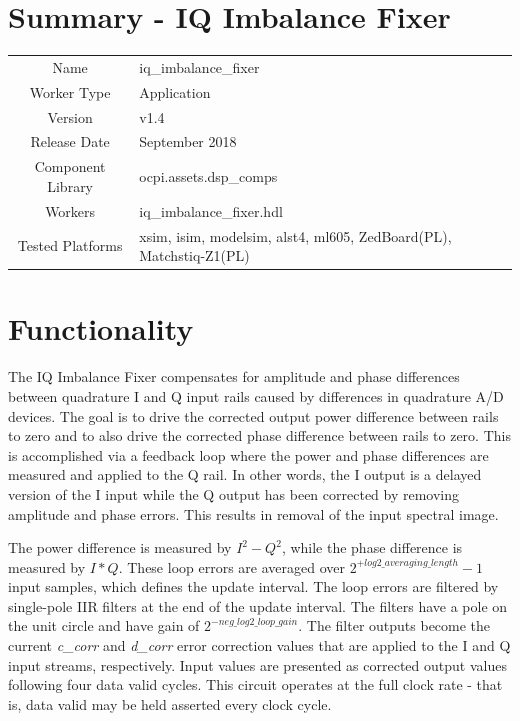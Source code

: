 \documentclass{article}
\author{} %
\date{Version \docVersion} %
\title{\docTitle}
\def\docVersion{1.4}
\def\comp{iq\_imbalance\_fixer}
\def\Comp{IQ Imbalance Fixer}
\begin{document}
\section*{Summary - \Comp}
\begin{tabular}{|c|M{13.5cm}|}
	\hline
	                  &                                                              \\
	\hline
	Name              & \comp                                                        \\
	\hline
	Worker Type       & Application                                                  \\
	\hline
	Version           & v\docVersion \\
	\hline
	Release Date      & September 2018 \\
	\hline
	Component Library & ocpi.assets.dsp\_comps                                        \\
	\hline
	Workers           & \comp.hdl                                                    \\
	\hline
	Tested Platforms  & xsim, isim, modelsim, alst4, ml605, ZedBoard(PL), Matchstiq-Z1(PL) \\
	\hline
\end{tabular}\section*{Functionality}
\begin{flushleft}
	The IQ Imbalance Fixer compensates for amplitude and phase differences between quadrature I and Q input rails caused by differences in quadrature A/D devices. The goal is to drive the corrected output power difference between rails to zero and to also drive the corrected phase difference between rails to zero. This is accomplished via a feedback loop where the power and phase differences are measured and applied to the Q rail. In other words, the I output is a delayed version of the I input while the Q output has been corrected by removing amplitude and phase errors. This results in removal of the input spectral image.\medskip

	The power difference is measured by $I^2 - Q^2$, while the phase difference is measured by $I*Q$. These loop errors are averaged over $2^{+log2\_averaging\_length}-1$ input samples, which defines the update interval. The loop errors are filtered by single-pole IIR filters at the end of the update interval. The filters have a pole on the unit circle and have gain of $2^{-neg\_log2\_loop\_gain}$. The filter outputs become the current \textit{c\_corr} and \textit{d\_corr} error correction values that are applied to the I and Q input streams, respectively. Input values are presented as corrected output values following four data valid cycles. This circuit operates at the full clock rate - that is, data valid may be held asserted every clock cycle.\medskip
\end{flushleft}
\end{document}

